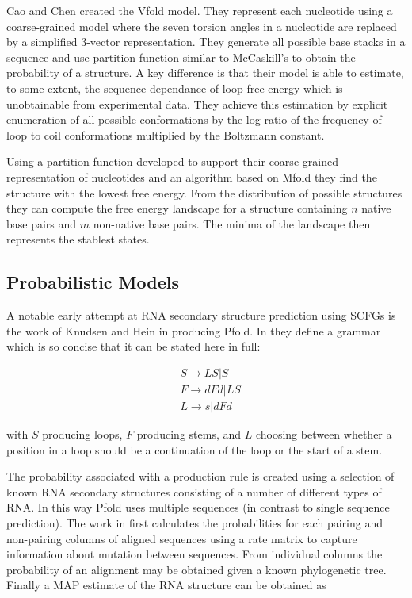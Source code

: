 \documentclass[journal]{IEEEtran}
\begin{document}
Cao and Chen \cite{cao2005predicting} created the Vfold model. They represent each nucleotide using a coarse-grained model where the seven torsion angles in a nucleotide are replaced by a simplified 3-vector representation. They generate all possible base stacks in a sequence and use partition function similar to McCaskill's to obtain the probability of a structure. A key difference is that their model is able to estimate, to some extent, the sequence dependance of loop free energy which is unobtainable from experimental data. They achieve this estimation by explicit enumeration of all possible conformations by the log ratio of the frequency of loop to coil conformations multiplied by the Boltzmann constant.

Using a partition function developed to support their coarse grained representation of nucleotides and an algorithm based on Mfold \cite{mathews1999expanded} they find the structure with the lowest free energy. From the distribution of possible structures they can compute the free energy landscape for a structure containing $n$ native base pairs and $m$ non-native base pairs. The minima of the landscape then represents the stablest states.

\subsection{Probabilistic Models}
\label{subsec:probalistic-models}


A notable early attempt at RNA secondary structure prediction using SCFGs is the work of Knudsen and Hein \cite{knudsen1999rna, knudsen2003pfold} in producing Pfold. In \cite{knudsen1999rna} they define a grammar which is so concise that it can be stated here in full:

\begin{equation}
\begin{split}
	& S \rightarrow LS | S \\
	& F \rightarrow dFd | LS \\
	& L \rightarrow s | dFd 
\end{split}
\end{equation}

with $S$ producing loops, $F$ producing stems, and $L$ choosing between whether a position in a loop should be a continuation of the loop or the start of a stem.

The probability associated with a production rule is created using a selection of known RNA secondary structures consisting of a number of different types of RNA. In this way Pfold uses multiple sequences (in contrast to single sequence prediction). The work in \cite{knudsen1999rna} first calculates the probabilities for each pairing and non-pairing columns of aligned sequences using a rate matrix to capture information about mutation between sequences. From individual columns the probability of an alignment may be obtained given a known phylogenetic tree. Finally a MAP estimate of the RNA structure can be obtained as
\end{document}
